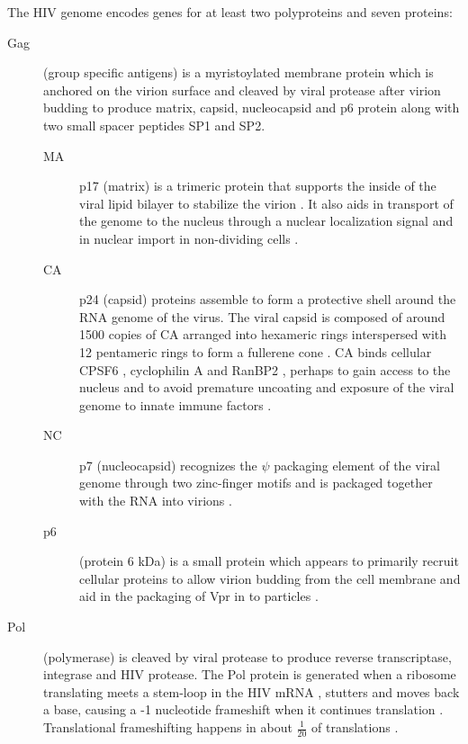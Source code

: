 \documentclass[../sherrill-Mix_thesis.tex]{subfiles}
\begin{document}
	The HIV genome encodes genes for at least two polyproteins and seven proteins: %
	\nobreak
	\begin{description}
		\item[Gag]
			(group specific antigens) is a myristoylated membrane protein which is anchored on the virion surface and cleaved by viral protease after virion budding to produce matrix, capsid, nucleocapsid and p6 protein along with two small spacer peptides SP1 and SP2. 
			\begin{description}
				\item[MA]
					p17 (matrix) is a trimeric protein that supports the inside of the viral lipid bilayer to stabilize the virion \citep{Hill1996}. It also aids in transport of the genome to the nucleus through a nuclear localization signal \citep{Heinzinger1994} and in nuclear import in non-dividing cells \citep{Bukrinsky1993}.
				\item[CA]
						p24 (capsid) proteins assemble to form a protective shell around the RNA genome of the virus. The viral capsid is composed of around 1500 copies of CA arranged into hexameric rings interspersed with 12 pentameric rings to form a fullerene cone \citep{Ganser1999,Li2000,Byeon2009,Zhao2013}. CA binds cellular CPSF6 \citep{Lee2010}, cyclophilin A \citep{Thali1994,Gamble1996} and RanBP2 \citep{Schaller2011}, perhaps to gain access to the nucleus \citep{Schaller2011,Ocwieja2011} and to avoid premature uncoating and exposure of the viral genome to innate immune factors \citep{Rasaiyaah2013}.
				\item[NC]
					p7 (nucleocapsid) recognizes the $\psi$ packaging element of the viral genome \citep{Harrison1992} through two zinc-finger motifs and is packaged together with the RNA into virions \citep{Dannull1994}.
				\item[p6]
					(protein 6 kDa) is a small protein which appears to primarily recruit cellular proteins to allow virion budding from the cell membrane \citep{Veronese1987,Goettlinger1991,Strack2003} and aid in the packaging of Vpr in to particles \citep{Paxton1993}.
			\end{description}
		\item[Pol]
				(polymerase) is cleaved by viral protease to produce reverse transcriptase, integrase and HIV protease. The Pol protein is generated when a ribosome translating \gag{} meets a stem-loop in the HIV mRNA \citep{Parkin1992}, stutters and moves back a base, causing a -1 nucleotide frameshift when it continues translation \citep{Jacks1988}. Translational frameshifting happens in about $\frac{1}{20}$ of translations \citep{Reil1990}.

\end{description}
\end{document}
